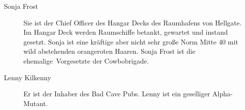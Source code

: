 
\begin{description}
    \item[Sonja Frost] Sie ist der Chief Officer des Hangar Decks des Raumhafens von Hellgate. Im Hangar Deck werden Raumschiffe    
        betankt, gewartet und instand gesetzt. Sonja ist eine kräftige aber nicht sehr große Norm Mitte 40 mit wild abstehenden orangeroten Haaren. Sonja Frost ist die ehemalige~Vorgesetzte der Cowbobrigade.
    \item[Lenny Kilkenny] Er ist der Inhaber des Bad Cave Pubs. Lenny ist ein geselliger Alpha-Mutant.
\end{description}
